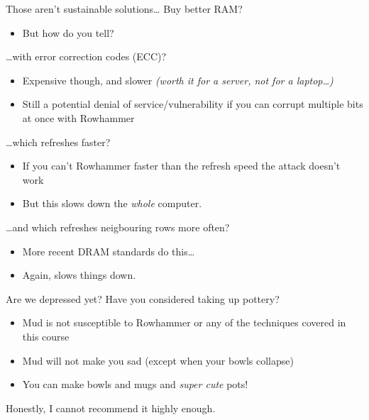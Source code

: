 \documentclass[9pt,aspectratio=169]{beamer}
\begin{document}
\begin{frame}[label={sec:org630f40f}]{Those aren't sustainable solutions\ldots{}}
Buy better RAM?
\begin{itemize}
\item But how do you tell?
\end{itemize}

\ldots{}with error correction codes (ECC)?
\begin{itemize}
\item Expensive though, and slower \emph{(worth it for a server, not for a laptop\ldots{})}
\item Still a potential denial of service/vulnerability if you can corrupt multiple bits at once with Rowhammer
\end{itemize}

\ldots{}which refreshes faster?
\begin{itemize}
\item If you can't Rowhammer faster than the refresh speed the attack doesn't work
\item But this slows down the \emph{whole} computer.
\end{itemize}

\ldots{}and which refreshes neigbouring rows more often?
\begin{itemize}
\item More recent DRAM standards do this\ldots{}
\item Again, slows things down.
\end{itemize}
\end{frame}

\begin{frame}[label={sec:org5226c91}]{Are we depressed yet?}
Have you considered taking up pottery?
\begin{itemize}
\item Mud is not susceptible to Rowhammer or any of the techniques covered in this course
\item Mud will not make you sad (except when your bowls collapse)
\item You can make bowls and mugs and \emph{super cute} pots!
\end{itemize}

\vfill
\begin{block}{Honestly, I cannot recommend it highly enough.}
\end{block}
\end{frame}
\end{document}
